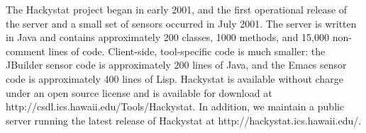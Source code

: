 \documentclass[12pt]{article}
\begin{document}

The Hackystat project began in early 2001, and the first operational release of
the server and a small set of sensors occurred in July 2001.  The
server is written in Java and contains approximately 200 classes,
1000 methods, and 15,000 non-comment lines of code. Client-side,
tool-specific code is much smaller: the JBuilder sensor code is
approximately 200 lines of Java, and the Emacs sensor code is approximately
400 lines of Lisp.  Hackystat is available without charge under an open
source license and is available for download at
http://csdl.ics.hawaii.edu/Tools/Hackystat. In addition, we maintain a
public server running the latest release of Hackystat at
http://hackystat.ics.hawaii.edu/.






\end{document}
